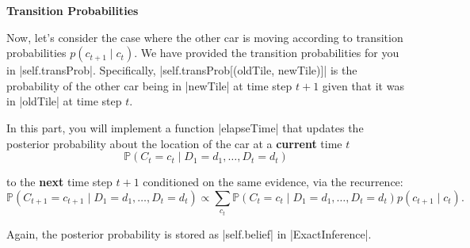 \item {\bf Transition Probabilities}

Now, let's consider the case where the other car is moving according to
transition probabilities $p(c_{t+1} \mid c_t)$. We have provided the transition
probabilities for you in |self.transProb|. Specifically,
|self.transProb[(oldTile, newTile)]| is the probability of the other car being
in |newTile| at time step $t+1$ given that it was in |oldTile| at time step $t$.

In this part, you will implement a function |elapseTime| that updates the
posterior probability about the location of the car at a {\bf current} time $t$
\[\mathbb P(C_t = c_t \mid D_1 = d_1, \dots, D_t = d_t)\]

to the {\bf next} time step $t+1$ conditioned on the same evidence, via the 
recurrence:
\[\mathbb P(C_{t+1} = c_{t+1} \mid D_1 = d_1, \dots, D_t = d_t) \propto \sum_{c_t} \mathbb P(C_t = c_t \mid D_1 = d_1, \dots, D_t = d_t) p(c_{t+1} \mid c_t).\]

Again, the posterior probability is stored as |self.belief| in |ExactInference|.

\begin{enumerate}

  

\end{enumerate}
